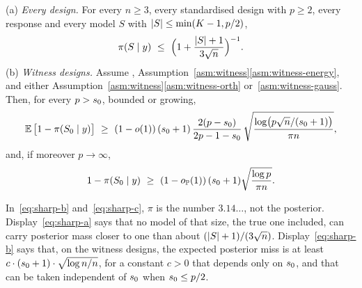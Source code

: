 \begin{theorem}\label{thm:sharp}
\textup{(a)} \emph{Every design.} For every $n\ge3$, every standardised design with $p\ge2$, every response and every
model $S$ with $\lvert S\rvert\le\min(K-1,p/2)$,
\begin{equation}\label{eq:sharp-a}
  \pi(S\mid y)\ \le\ \Big(1+\frac{\lvert S\rvert+1}{3\sqrt n}\Big)^{-1}.
\end{equation}
\textup{(b)} \emph{Witness designs.} Assume , Assumption~\ref{asm:witness}\ref{asm:witness-energy}, and either
Assumption~\ref{asm:witness}\ref{asm:witness-orth} or~\ref{asm:witness-gauss}. Then, for every $p>s_0$, bounded or
growing,
\begin{equation}\label{eq:sharp-b}
  \E\big[1-\pis{\Sz}\big]\ \ge\ (1-o(1))\,(\sz+1)\,\frac{2(p-\sz)}{2p-1-\sz}\,
  \sqrt{\frac{\log\!\big(p\sqrt n/(\sz+1)\big)}{\pi n}},
\end{equation}
and, if moreover $p\to\infty$,
\begin{equation}\label{eq:sharp-c}
  1-\pi(S_0\mid y)\ \ge\ (1-o_{\mathbb{P}}(1))\,(s_0+1)\sqrt{\frac{\log p}{\pi n}}.
\end{equation}
\end{theorem}


In~\eqref{eq:sharp-b} and~\eqref{eq:sharp-c}, $\pi$ is the number $3.14\ldots$, not the posterior.
Display~\eqref{eq:sharp-a} says that no model of that size, the true one included, can carry posterior mass closer to one
than about $(\lvert S\rvert+1)/(3\sqrt n)$. Display~\eqref{eq:sharp-b} says that, on the witness designs, the expected posterior
miss is at least $c\cdot(s_0+1)\cdot\sqrt{\log n/n}$, for a constant $c>0$ that depends only on $s_0$, and that can be taken independent of $s_0$ when
$s_0\le p/2$.

